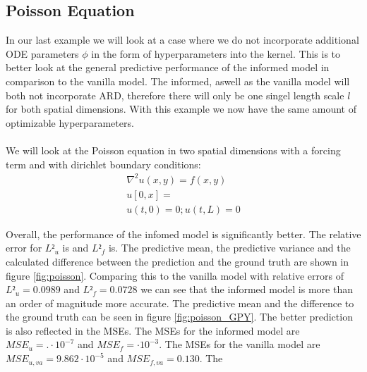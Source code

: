 \documentclass{article}
\begin{document}
\subsection{Poisson Equation}
In our last example we will look at a case where we do not incorporate additional ODE parameters $\phi$ in the form of hyperparameters into the kernel. This is to better look at the general predictive performance of the informed model in comparison to the vanilla model. The informed, aswell as the vanilla model will both not incorporate ARD, therefore there will only be one singel length scale $l$ for both spatial dimensions. With this example we now have the same amount of optimizable hyperparameters. \\
\\
 We will look at the Poisson equation in two spatial dimensions with a
forcing term and with dirichlet boundary conditions:
\begin{equation}
    \begin{aligned}
        \nabla^2 u(x,y) = f(x,y) \\ u[0,x] = \\ u(t,0) = 0; u(t,L) = 0
    \end{aligned}
\end{equation}


 Overall, the performance of the infomed model is significantly better. The relative error for $L²_u$ is and $L²_f$ is. The predictive mean, the predictive variance and the calculated difference between the prediction and the ground truth are shown in figure \ref{fig:poisson}. Comparing this to the vanilla model with relative errors of $L²_u = 0.0989$ and $L²_f = 0.0728$ we can see that the informed model is more than an order of magnitude more accurate. The predictive mean and the difference to the ground truth can be seen in figure \ref{fig:poisson_GPY}. The better prediction is also reflected in the MSEs. The MSEs for the informed model are $MSE_u = . \cdot 10^{-7}$ and $MSE_f =  \cdot 10^{-3}$. The MSEs for the vanilla model are $MSE_{u,va} = 9.862  \cdot 10^{-5}$ and $MSE_{f,va} = 0.130$. The \\
\\
\end{document}
